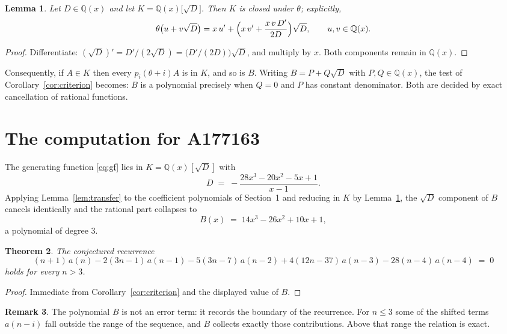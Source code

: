 \documentclass[11pt,a4paper]{article}
\theoremstyle{plain}
\newtheorem{theorem}{Theorem}
\newtheorem{lemma}[theorem]{Lemma}
\theoremstyle{definition}
\newtheorem{remark}[theorem]{Remark}
\begin{document}
\begin{lemma}\label{lem:field}
Let $D\in\mathbb{Q}(x)$ and let $K=\mathbb{Q}(x)\bigl[\sqrt{D}\bigr]$. Then $K$ is closed
under $\theta$; explicitly,
\[
\theta\bigl(u+v\sqrt{D}\bigr)=x\,u'+\Bigl(x\,v'+\frac{x\,v\,D'}{2D}\Bigr)\sqrt{D},
\qquad u,v\in\mathbb{Q}(x).
\]
\end{lemma}

\begin{proof}
Differentiate: $(\sqrt{D})'=D'/(2\sqrt{D})=\bigl(D'/(2D)\bigr)\sqrt{D}$, and multiply by
$x$. Both components remain in $\mathbb{Q}(x)$.
\end{proof}

Consequently, if $A\in K$ then every $p_{i}(\theta+i)A$ is in $K$, and so is $B$. Writing
$B=P+Q\sqrt{D}$ with $P,Q\in\mathbb{Q}(x)$, the test of Corollary~\ref{cor:criterion}
becomes: $B$ is a polynomial precisely when $Q=0$ and $P$ has constant denominator. Both
are decided by exact cancellation of rational functions.

\section{The computation for A177163}

The generating function \eqref{eq:gf} lies in $K=\mathbb{Q}(x)[\sqrt{D}]$ with
\[
D \;=\; - \frac{28 x^{3} - 20 x^{2} - 5 x + 1}{x - 1} .
\]
Applying Lemma~\ref{lem:transfer} to the coefficient polynomials of Section~1 and reducing
in $K$ by Lemma~\ref{lem:field}, the $\sqrt{D}$ component of $B$ cancels identically and
the rational part collapses to
\[
B(x)\;=\;14 x^{3} - 26 x^{2} + 10 x + 1 ,
\]
a polynomial of degree $3$.

\begin{theorem}
The conjectured recurrence
\[
(n + 1)\,a(n) -  2 \left(3 n - 1\right)\,a(n-1) -  5 \left(3 n - 7\right)\,a(n-2) + 4 \left(12 n - 37\right)\,a(n-3) -  28 \left(n - 4\right)\,a(n-4) \;=\;0
\]
holds for every $n>3$.
\end{theorem}

\begin{proof}
Immediate from Corollary~\ref{cor:criterion} and the displayed value of $B$.
\end{proof}

\begin{remark}
The polynomial $B$ is not an error term: it records the boundary of the recurrence. For
$n\le3$ some of the shifted terms $a(n-i)$ fall outside the range of the sequence,
and $B$ collects exactly those contributions. Above that range the relation is exact.
\end{remark}
\end{document}
